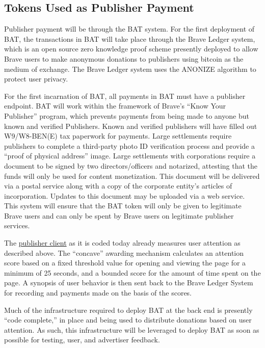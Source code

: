 \documentclass[11pt]{article}
\begin{document}
\subsection{Tokens Used as Publisher Payment}
\label{sec-4-3}

Publisher payment will be through the BAT system. For the first deployment of BAT, the transactions in BAT will take place through the Brave Ledger system, which is an open source zero knowledge proof scheme presently deployed to allow Brave users to make anonymous donations to publishers using bitcoin as the medium of exchange.  The Brave Ledger system uses the ANONIZE\cite{13} algorithm to protect user privacy. 

For the first incarnation of BAT, all payments in BAT must have a publisher endpoint. BAT will work within the framework of Brave’s ``Know Your Publisher'' program, which prevents payments from being made to anyone but known and verified Publishers. Known and verified publishers will have filled out W9/W8-BEN(E) tax paperwork for payments. Large settlements require publishers to complete a third-party photo ID verification process and provide a ``proof of physical address'' image. Large settlements with corporations require a document to be signed by two directors/officers and notarized, attesting that the funds will only be used for content monetization. This document will be delivered via a postal service along with a copy of the corporate entity’s articles of incorporation. Updates to this document may be uploaded via a web service. This system will ensure that the BAT token will only be given to legitimate Brave users and can only be spent by Brave users on legitimate publisher services.

The \href{https://github.com/brave/ledger-publisher}{publisher client} as it is coded today already measures user attention as described above. The “concave” awarding mechanism calculates an attention score based on a fixed threshold value for opening and viewing the page for a minimum of 25 seconds, and a bounded score for the amount of time spent on the page. A synopsis of user behavior is then sent back to the Brave Ledger System for recording and payments made on the basis of the scores.

Much of the infrastructure required to deploy BAT at the back end is presently “code complete,” in place and being used to distribute donations based on user attention. As such, this infrastructure will be leveraged to deploy BAT as soon as possible for testing, user, and advertiser feedback.
\end{document}
